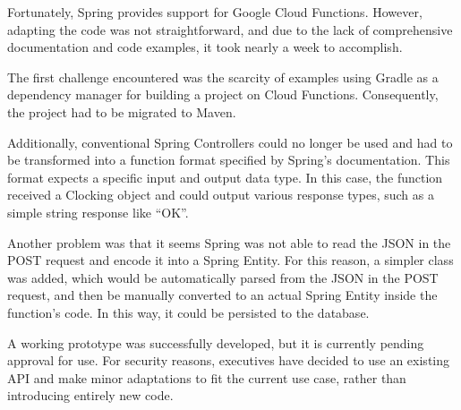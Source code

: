 Fortunately, Spring provides support for Google Cloud Functions. However, adapting the code was 
not straightforward, and due to the lack of comprehensive documentation and code examples, it took 
nearly a week to accomplish.

The first challenge encountered was the scarcity of examples using 
Gradle as a dependency manager for building a project on Cloud Functions. Consequently, the 
project had to be migrated to Maven.

Additionally, conventional Spring Controllers could no longer 
be used and had to be transformed into a function format specified by Spring's documentation. This 
format expects a specific input and output data type. In this case, the function received a 
Clocking object and could output various response types, such as a simple string response like 
``OK''.

Another problem was that it seems Spring was not able to read the JSON in the POST request and 
encode it into a Spring Entity. For this reason, a simpler class was added, which would be 
automatically parsed from the JSON in the POST request, and then be manually converted to an 
actual Spring Entity inside the function's code. In this way, it could be persisted to the 
database.

A working prototype was successfully developed, but it is currently pending approval for use. 
For security reasons, executives have decided to use an existing API and make minor adaptations to 
fit the current use case, rather than introducing entirely new code.
